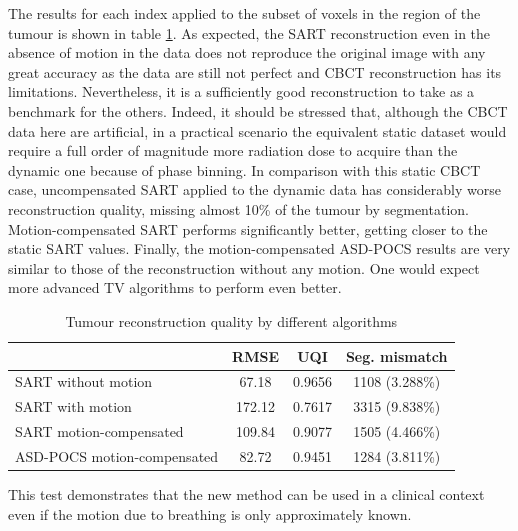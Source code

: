 The results for each index applied to the subset of voxels in the region of the tumour is shown in table \ref{tab:quality}.  As expected, the SART reconstruction even in the absence of motion in the data does not reproduce the original image with any great accuracy as the data are still not perfect and CBCT reconstruction has its limitations.  Nevertheless, it is a sufficiently good reconstruction to take as a benchmark for the others.  Indeed, it should be stressed that, although the CBCT data here are artificial, in a practical scenario the equivalent static dataset would require a full order of magnitude more radiation dose to acquire than the dynamic one because of phase binning.  In comparison with this static CBCT case, uncompensated SART applied to the dynamic data has considerably worse reconstruction quality, missing almost 10\% of the tumour by segmentation.  Motion-compensated SART performs significantly better, getting closer to the static SART values.  Finally, the motion-compensated ASD-POCS results are very similar to those of the reconstruction without any motion.  One would expect more advanced TV algorithms to perform even better.
  
\begin{table}[H]
\begin{center}
\caption{Tumour reconstruction quality by different algorithms}
\label{tab:quality}
\begin{tabular}{|l|| c | c | c |}
\hline
 & RMSE & UQI & Seg. mismatch \\
\hline \hline  
 SART without motion & 67.18 & 0.9656 & 1108 (3.288\%)\\
 SART with motion & 172.12 & 0.7617 & 3315 (9.838\%)\\
 SART motion-compensated & 109.84 & 0.9077 & 1505 (4.466\%)\\
 ASD-POCS motion-compensated & 82.72 & 0.9451 & 1284 (3.811\%)\\
\hline  
\end{tabular}
\end{center}
\end{table}

This test demonstrates that the new method can be used in a clinical context even if the motion due to breathing is only approximately known.



